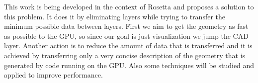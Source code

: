 This work is being developed in the context of Rosetta and proposes a solution to this problem. It does it by eliminating layers while trying to transfer the minimum possible data between layers. First we aim to get the geometry as fast as possible to the GPU, so since our goal is just visualization we jump the CAD layer. Another action is to reduce the amount of data that is transferred and it is achieved by transferring only a very concise description of the geometry that is generated by code running on the GPU. Also some techniques will be studied and applied to improve performance.






 






 
